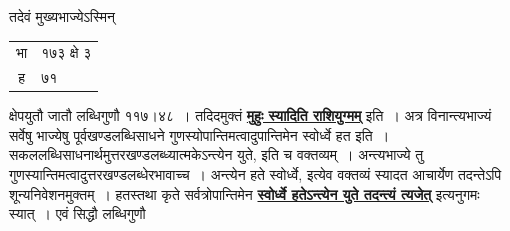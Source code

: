\documentclass[11pt, openany]{book}
\begin{document}
{{\noindent तदेवं मुख्यभाज्येऽस्मिन्
\vspace{-2mm}

\begin{table}[h!]
    \centering\s
    \begin{tabular}{cl}
       भा &१७३ क्षे ३ \\
 ह& ७१
    \end{tabular}
\end{table}
\vspace{-2mm}

\noindent क्षेपयुतौ जातौ लब्धिगुणौ ११७।४८~। तदिदमुक्तं \hyperref[51]{\textbf{मुहुः स्यादिति राशियुग्मम्}} इति~। अत्र विनान्त्यभाज्यं सर्वेषु भाज्येषु पूर्वखण्डलब्धिसाधने
गुणस्योपान्तिमत्वादुपान्तिमेन स्वोर्ध्वे हत इति~।
सकललब्धिसाधनार्थमुत्तरखण्डलब्ध्यात्मकेऽन्त्येन युते, 
इति च वक्तव्यम्~। अन्त्यभाज्ये तु
गुणस्यान्तिमत्वादुत्तरखण्डलब्धेरभावाच्च~। 
अन्त्येन हते स्वोर्ध्वे, इत्येव वक्तव्यं स्यादत आचार्येण तदन्तेऽपि
शून्यनिवेशनमुक्तम्~। हतस्तथा कृते सर्वत्रोपान्तिमेन \hyperref[51]{\textbf{स्वोर्ध्वे हतेऽन्त्येन युते तदन्त्यं त्यजेत्}} इत्यनुगमः स्यात्~। एवं सिद्धौ लब्धिगुणौ 
\vspace{-2mm}

}}
\end{document}
